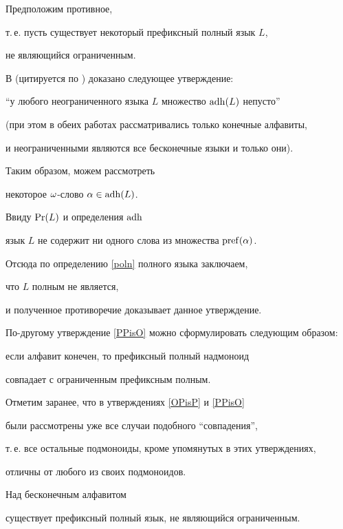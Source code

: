 \begin{pf}


 Предположим противное,


 т.\,е. пусть существует некоторый префиксный полный язык $L$,


 не являющийся ограниченным.


 В \cite{ei} (цитируется по \cite{cs}) доказано следующее утверждение:


 ``у любого неограниченного языка $L$ множество $\operatorname{adh}(L)$ непусто''


 (при этом в обеих работах рассматривались только конечные алфавиты,


 и неограниченными являются все бесконечные языки и только они).


 Таким образом, можем рассмотреть


 некоторое $\omega$-слово $\alpha\in\operatorname{adh}(L)$.


 Ввиду $\operatorname{Pr}(L)$ и определения $\operatorname{adh}$


 язык $L$ не содержит ни одного слова из множества $\operatorname{pref}(\alpha)$.


 Отсюда по определению \ref{poln} полного языка заключаем,


 что $L$ полным не является,


 и полученное противоречие доказывает данное утверждение.


\end{pf}





 По-другому утверждение \ref{PPisO} можно сформулировать следующим образом:


 если алфавит конечен, то префиксный полный надмоноид


 совпадает с ограниченным префиксным полным.


 Отметим заранее, что в утверждениях \ref{OPisP} и \ref{PPisO}


были рассмотрены уже все случаи подобного ``совпадения'',


 т.\,е. все остальные подмоноиды, кроме упомянутых в этих утверждениях,


 отличны от любого из своих подмоноидов.





 \begin{props} \label{PPnotO}


 Над бесконечным алфавитом


 существует префиксный полный язык, не являющийся ограниченным.


 \end{props}





